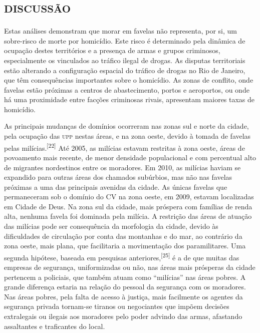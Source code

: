 \documentclass{article}
\begin{document}
\section{\textsc{discussão}}

Estas análises demonstram que morar em favelas não representa, por si, um
sobre-risco de morte por homicídio. Este risco é determinado pela dinâmica de
ocupação destes territórios e a presença de armas e grupos criminosos,
especialmente os vinculados ao tráfico ilegal de drogas. As disputas
territoriais estão alterando a configuração espacial do tráfico de drogas no Rio
de Janeiro, que têm consequências importantes sobre o homicídio. As zonas de
conflito, onde favelas estão próximas a centros de abastecimento, portos e
aeroportos, ou onde há uma proximidade entre facções criminosas rivais,
apresentam maiores taxas de homicídio.

As principais mudanças de domínios ocorreram nas zonas sul e norte da cidade,
pela ocupação das \textsc{upp} nestas áreas, e na zona oeste, devido à tomada de favelas
pelas milícias.\textsuperscript{[}\textsuperscript{22}\textsuperscript{]}
Até 2005, as milícias estavam restritas à zona oeste, áreas de povoamento mais
recente, de menor densidade populacional e com percentual alto de migrantes
nordestinos entre os moradores. Em 2010, as milícias haviam se expandido para
outras áreas dos chamados subúrbios, mas não nas favelas próximas a uma das
principais avenidas da cidade. As únicas favelas que permaneceram sob o domínio
do CV na zona oeste, em 2009, estavam localizadas em Cidade de Deus. Na zona sul
da cidade, mais próspera com famílias de renda alta, nenhuma favela foi dominada
pela milícia. A restrição das áreas de atuação das milícias pode ser
consequência da morfologia da cidade, devido às dificuldades de circulação por
conta das montanhas e do mar, ao contrário da zona oeste, mais plana, que
facilitaria a movimentação dos paramilitares. Uma segunda hipótese, baseada em
pesquisas anteriores,\textsuperscript{[}\textsuperscript{25}\textsuperscript{]}
é a de que muitas das empresas de segurança, uniformizadas ou não, nas áreas
mais prósperas da cidade pertencem a policiais, que também atuam como “milícias”
nas áreas pobres. A grande diferença estaria na relação do pessoal da segurança
com os moradores. Nas áreas pobres, pela falta de acesso à justiça, mais
facilmente os agentes da segurança privada tornam-se tiranos ou negociantes que
impõem decisões extralegais ou ilegais aos moradores pelo poder advindo das
armas, afastando assaltantes e traficantes do local.
\end{document}
